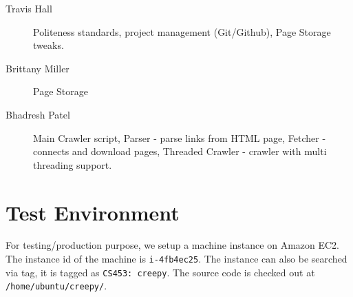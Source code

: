 \documentclass[letterpaper,11pt,twoside]{article}
\begin{document}
\begin{description}
 \item[Travis Hall] Politeness standards, project management (Git/Github), Page Storage tweaks.
 \item[Brittany Miller] Page Storage
 \item[Bhadresh Patel] Main Crawler script, Parser - parse links from HTML page, Fetcher - connects and download pages, Threaded Crawler - crawler with multi threading support.
\end{description}

\section{Test Environment}
For testing/production purpose, we setup a machine instance on Amazon EC2. The instance id of the machine is \texttt{i-4fb4ec25}. The instance can also be searched via tag, it is tagged as \texttt{CS453: creepy}. The source code is checked out at \texttt{/home/ubuntu/creepy/}.
\end{document}
